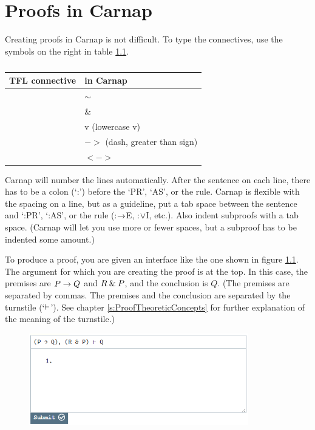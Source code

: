 


\chapter{Proofs in Carnap}\label{s:Carnap-proofs}

Creating proofs in Carnap is not difficult. To type the connectives, use the symbols on the right in table \ref{symbols-Carnap}. 

\begin{table}\centering\sffamily\footnotesize
{}
\begin{tabular}{@{}l l@{}}\toprule
TFL connective & in Carnap \\\midrule
	\enot & $ \sim$\\
	\eand & \&\\
	\eor & v (lowercase v)\\
	\eif & $-$$>$ (dash, greater than sign)\\
	\eiff & $<$$-$$>$\\
\bottomrule
\end{tabular}
\caption{}\label{symbols-Carnap}
\end{table}


Carnap will number the lines automatically. After the sentence on each line, there has to be a colon (`:') before the `PR', `AS', or the rule. Carnap is flexible with the spacing on a line, but as a guideline, put a tab space between the sentence and `:PR', `:AS', or the rule (:$\rightarrow$E, :$\vee$I, etc.). Also indent subproofs with a tab space. (Carnap will let you use more or fewer spaces, but a subproof has to be indented some amount.)

To produce a proof, you are given an interface like the one shown in figure \ref{fig:proof-1a}. The argument for which you are creating the proof is at the top. In this case, the premises are $P \rightarrow Q$ and $R \mathbin{\&} P$, and the conclusion is $Q$. (The premises are separated by commas. The premises and the conclusion are separated by the turnstile (`$\vdash$'). See chapter \ref{s:ProofTheoreticConcepts} for further explanation of the meaning of the turnstile.)

\begin{figure}
\centering
\includegraphics[height=4cm]{textbook--1a.PNG}
\caption{}
\label{fig:proof-1a}
\end{figure}

